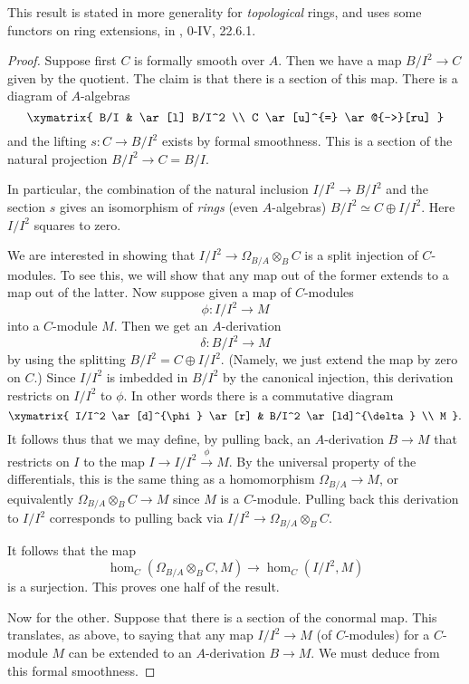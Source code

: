 This result is stated in more generality  for \emph{topological} rings, and uses
some functors on ring extensions, in \cite{EGA}, 0-IV, 22.6.1. 

\begin{proof} 
Suppose first $C$ is formally smooth over $A$.
Then we have a map
\( B/I^2 \to C  \)
given by the quotient. The claim is that there is a section of this map.
There is a diagram of $A$-algebras
\[ \xymatrix{
B/I & \ar[l] B/I^2 \\
C \ar[u]^{=} \ar@{-->}[ru]
}\]
and the lifting $s: C \to B/I^2$ exists by formal smoothness. 
This is a section of the natural projection $B/I^2 \to C = B/I$.


In particular, the combination of the natural inclusion $I/I^2 \to B/I^2$ and
the section $s$ gives an isomorphism  of \emph{rings} (even $A$-algebras)
\( B/I^2 \simeq C \oplus I/I^2 . \)
Here $I/I^2$ squares to zero.

We are interested in showing that $I/I^2 \to \Omega_{B/A} \otimes_B C$ is a
split injection of $C$-modules. To see this, we will show that any map out of the former
extends to a map out of the latter.
Now suppose given a map
of $C$-modules
\[ \phi:  I/I^2 \to M \]
into a $C$-module $M$.
Then we get an $A$-derivation
\[ \delta:  B/I^2 \to M  \]
by using the splitting $B/I^2 = C \oplus I/I^2$.
(Namely, we just extend the map by zero on $C$.)
Since $I/I^2$ is imbedded in $B/I^2$ by the canonical injection, this
derivation restricts on $I/I^2$ to $\phi$. In other words there is a
commutative diagram
\[ \xymatrix{
I/I^2 \ar[d]^{\phi}  \ar[r] &  B/I^2 \ar[ld]^{\delta} \\
M
}.\]
It follows thus that we may define, by pulling back, an $A$-derivation $B \to
M$ that restricts on $I$ to the map $I \to I/I^2 \stackrel{\phi}{\to} M$. 
By the universal property of the differentials, this is the same thing as a
homomorphism $\Omega_{B/A} \to M$, or equivalently $\Omega_{B/A} \otimes_B C
\to M$ since $M$ is a $C$-module.
Pulling back this derivation to $I/I^2$ corresponds to pulling back via $I/I^2
\to \Omega_{B/A} \otimes_B C$.

It follows that the map
\[ \hom_C(\Omega_{B/A} \otimes_B C, M) \to \hom_C(I/I^2, M)  \]
is a surjection. This proves one half of the result.

Now for the other.
Suppose that there is a section of the conormal map.
This translates, as above, to saying that
any map $I/I^2 \to M$  (of $C$-modules) for a $C$-module $M$
 can be extended to an $A$-derivation $B \to M$.
We must deduce from this formal smoothness.


\end{proof}
